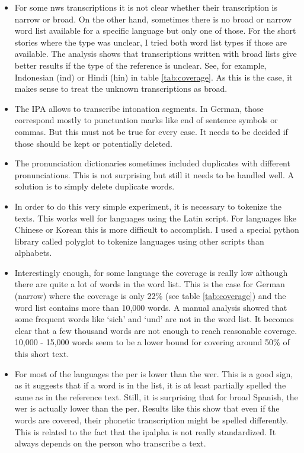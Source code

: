 \begin{itemize}
\item For some \ac{nws} transcriptions it is not clear whether their transcription is narrow or broad. On the other hand, sometimes there is no broad or narrow word list available for a specific language but only one of those. For the short stories where the type was unclear, I tried both word list types if those are available. The analysis shows that transcriptions written with broad lists give better results if the type of the reference is unclear. See, for example, Indonesian (ind) or Hindi (hin) in table \ref{tab:coverage}. As this is the case, it makes sense to treat the unknown transcriptions as broad. 
\item The IPA allows to transcribe intonation segments. In German, those correspond mostly to punctuation marks like end of sentence symbols or commas. But this must not be true for every case. It needs to be decided if those should be kept or potentially deleted.
\item The pronunciation dictionaries sometimes included duplicates with different pronunciations. This is not surprising but still it needs to be handled well. A solution is to simply delete duplicate words.
\item In order to do this very simple experiment, it is necessary to tokenize the texts. This works well for languages using the Latin script. For languages like Chinese or Korean this is more difficult to accomplish. I used a special python library called polyglot to tokenize languages using other scripts than alphabets.
\item Interestingly enough, for some language the coverage is really low although there are quite a lot of words in the word list. This is the case for German (narrow) where the coverage is only 22\% (see table \ref{tab:coverage}) and the word list contains more than 10,000 words. A manual analysis showed that some frequent words like `sich' and `und' are not in the word list. It becomes clear that a few thousand words are not enough to reach reasonable coverage. 10,000 - 15,000 words seem to be a lower bound for covering around 50\% of this short text.
\item For most of the languages the \ac{per} is lower than the \ac{wer}. This is a good sign, as it suggests that if a word is in the list, it is at least partially spelled the same as in the reference text. Still, it is surprising that for broad Spanish, the \ac{wer} is actually lower than the \ac{per}. Results like this show that even if the words are covered, their phonetic transcription might be spelled differently. This is related to the fact that the \ac{ipalpha} is not really standardized. It always depends on the person who transcribe a text.
\end{itemize}

